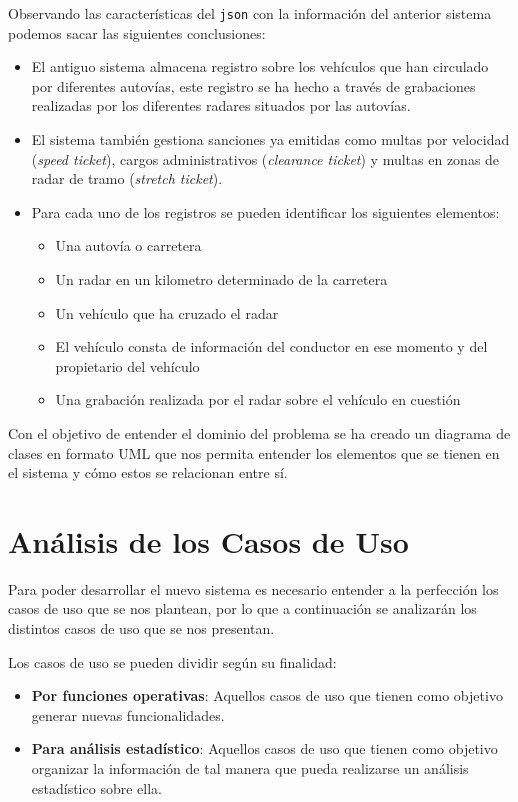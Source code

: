 \documentclass[]{article}
\begin{document}
Observando las características del \texttt{json} con la información del anterior sistema podemos sacar las siguientes conclusiones:
\begin{itemize}
    \item El antiguo sistema almacena registro sobre los vehículos que han circulado por diferentes autovías, este registro se ha hecho a través de grabaciones realizadas por los diferentes radares situados por las autovías.
    \item El sistema también gestiona sanciones ya emitidas como multas por velocidad (\textit{speed ticket}), cargos administrativos (\textit{clearance ticket}) y multas en zonas de radar de tramo (\textit{stretch ticket}).
    \item Para cada uno de los registros se pueden identificar los siguientes elementos:
    \begin{itemize}
        \item Una autovía o carretera
        \item Un radar en un kilometro determinado de la carretera
        \item Un vehículo que ha cruzado el radar
        \item El vehículo consta de información del conductor en ese momento y del propietario del vehículo
        \item Una grabación realizada por el radar sobre el vehículo en cuestión
    \end{itemize} 
\end{itemize}

Con el objetivo de entender el dominio del problema se ha creado un diagrama de clases en formato UML que nos permita entender los elementos que se tienen en el sistema y cómo estos se relacionan entre sí.

\section{Análisis de los Casos de Uso}
\label{sec:analisis_casos_de_uso}

Para poder desarrollar el nuevo sistema es necesario entender a la perfección los casos de uso que se nos plantean, por lo que a continuación se analizarán los distintos casos de uso que se nos presentan.

Los casos de uso se pueden dividir según su finalidad:
\begin{itemize}
    \item \textbf{Por funciones operativas}: Aquellos casos de uso que tienen como objetivo generar nuevas funcionalidades.
    \item \textbf{Para análisis estadístico}: Aquellos casos de uso que tienen como objetivo organizar la información de tal manera que pueda realizarse un análisis estadístico sobre ella.
\end{itemize}
\end{document}
